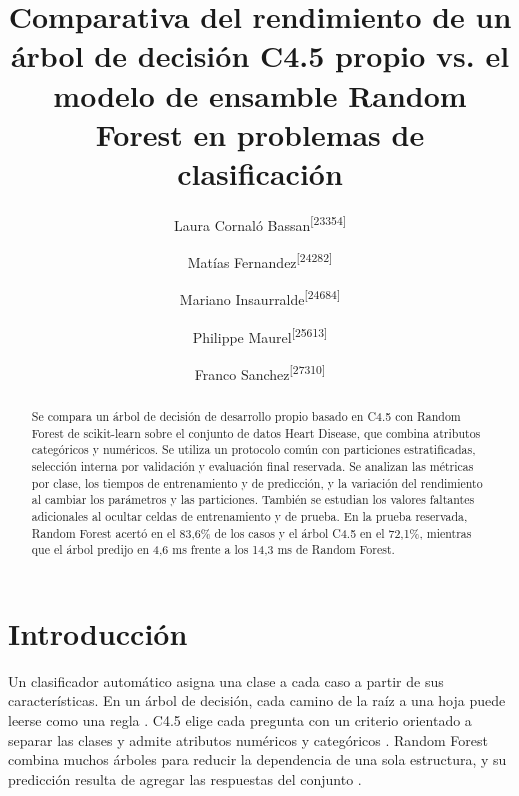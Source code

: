 \documentclass[runningheads]{llncs}
\begin{document}
\title{Comparativa del rendimiento de un árbol de decisión C4.5 propio vs. el modelo de ensamble Random Forest en problemas de clasificación}

\author{Laura Cornaló Bassan\textsuperscript{[23354]} \and
Matías Fernandez\textsuperscript{[24282]} \and
Mariano Insaurralde\textsuperscript{[24684]} \and
Philippe Maurel\textsuperscript{[25613]} \and
Franco Sanchez\textsuperscript{[27310]}}


\maketitle

\begin{abstract}
Se compara un árbol de decisión de desarrollo propio basado en C4.5 con Random Forest de scikit-learn sobre el conjunto de datos Heart Disease, que combina atributos categóricos y numéricos. Se utiliza un protocolo común con particiones estratificadas, selección interna por validación y evaluación final reservada. Se analizan las métricas por clase, los tiempos de entrenamiento y de predicción, y la variación del rendimiento al cambiar los parámetros y las particiones. También se estudian los valores faltantes adicionales al ocultar celdas de entrenamiento y de prueba. En la prueba reservada, Random Forest acertó en el 83,6\% de los casos y el árbol C4.5 en el 72,1\%, mientras que el árbol predijo en 4,6 ms frente a los 14,3 ms de Random Forest.
\end{abstract}

\section{Introducción}

Un clasificador automático asigna una clase a cada caso a partir de sus características. En un árbol de decisión, cada camino de la raíz a una hoja puede leerse como una regla \cite{liu2011}. C4.5 elige cada pregunta con un criterio orientado a separar las clases y admite atributos numéricos y categóricos \cite{liu2011}. Random Forest combina muchos árboles para reducir la dependencia de una sola estructura, y su predicción resulta de agregar las respuestas del conjunto \cite{breiman2001}.
\end{document}
